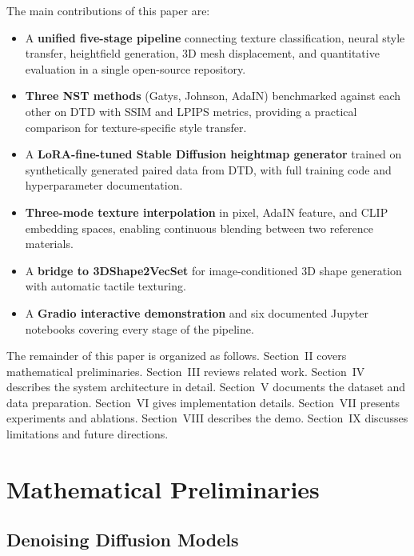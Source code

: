 \documentclass[conference]{IEEEtran}
\begin{document}
The main contributions of this paper are:
\begin{itemize}
  \item A \textbf{unified five-stage pipeline} connecting texture classification,
        neural style transfer, heightfield generation, 3D mesh displacement,
        and quantitative evaluation in a single open-source repository.
  \item \textbf{Three NST methods} (Gatys, Johnson, AdaIN) benchmarked against
        each other on DTD with SSIM and LPIPS metrics, providing a practical
        comparison for texture-specific style transfer.
  \item A \textbf{LoRA-fine-tuned Stable Diffusion heightmap generator} trained
        on synthetically generated paired data from DTD, with full training
        code and hyperparameter documentation.
  \item \textbf{Three-mode texture interpolation} in pixel, AdaIN feature, and
        CLIP embedding spaces, enabling continuous blending between two
        reference materials.
  \item A \textbf{bridge to 3DShape2VecSet} \cite{b12} for image-conditioned
        3D shape generation with automatic tactile texturing.
  \item A \textbf{Gradio interactive demonstration} and six documented Jupyter
        notebooks covering every stage of the pipeline.
\end{itemize}

The remainder of this paper is organized as follows. Section~II covers
mathematical preliminaries. Section~III reviews related work. Section~IV
describes the system architecture in detail. Section~V documents the dataset
and data preparation. Section~VI gives implementation details. Section~VII
presents experiments and ablations. Section~VIII describes the demo.
Section~IX discusses limitations and future directions.

\section{Mathematical Preliminaries}

\subsection{Denoising Diffusion Models}
\end{document}
